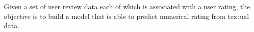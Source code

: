 Given a set of user review data each of which is associated with a
user rating, the objective is to build a model that is able to predict
numerical rating from textual data.
